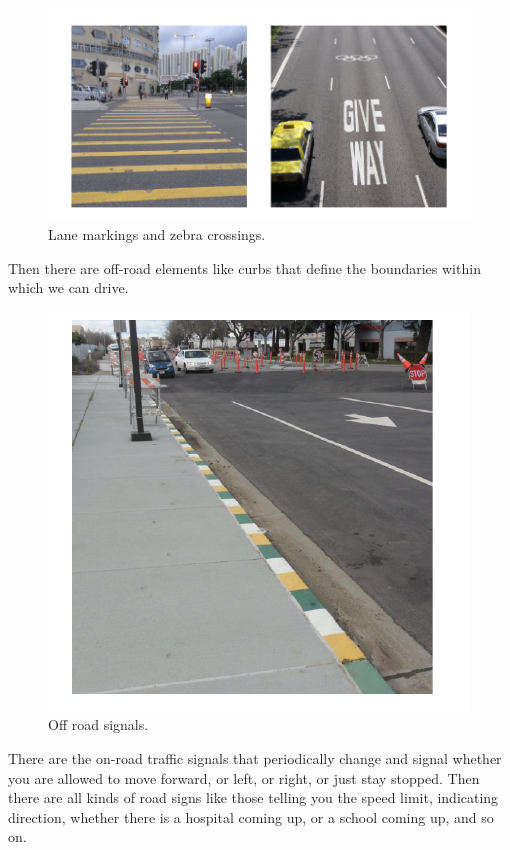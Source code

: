 \begin{figure}[!htb]
\begin{center}
\includegraphics[scale=0.280]{img/intro_self_driving/static_objects.jpeg}
\end{center}
\caption{Lane markings and zebra crossings.}
\label{static_objects}
\end{figure}

Then there are off-road elements like curbs that define the boundaries within which we can drive. 

\begin{figure}[!htb]
\begin{center}
\includegraphics[scale=0.280]{img/intro_self_driving/static_objects_2.jpeg}
\end{center}
\caption{Off road signals.}
\label{static_objects_2}
\end{figure}

There are the on-road traffic signals that periodically change and signal whether you are allowed to move forward, or left, or right, or just stay stopped. 
Then there are all kinds of road signs like those telling you the speed limit, indicating direction, whether there is a hospital coming up, or a school coming up, and so on. 

